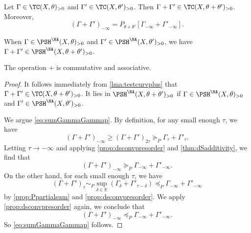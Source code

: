 \begin{proposition}\label{prop:testcurvesumproperty}
    Let $\Gamma \in \TC(X,\theta)_{>0}$ and $\Gamma' \in \TC(X,\theta')_{>0}$. Then $\Gamma+\Gamma'\in \TC(X,\theta+\theta')_{>0}$. Moreover,
    \begin{equation}\label{eq:sumGammaGammap}
    (\Gamma+\Gamma')_{-\infty}=P_{\theta+\theta'}\left[\Gamma_{-\infty}+\Gamma'_{-\infty}\right].
    \end{equation}

    When $\Gamma\in \PSH^{\NA}(X,\theta)_{>0}$ and $\Gamma'\in \PSH^{\NA}(X,\theta')_{>0}$, we have $\Gamma+\Gamma'\in \PSH^{\NA}(X,\theta+\theta')_{>0}$.

    The operation $+$ is commutative and associative.
\end{proposition}
\begin{proof}
    It follows immediately from \cref{lma:testcurvplus} that $\Gamma+\Gamma'\in \TC(X,\theta+\theta')_{>0}$. It lies in $\PSH^{\NA}(X,\theta+\theta')_{>0}$ if $\Gamma\in \PSH^{\NA}(X,\theta)_{>0}$ and $\Gamma'\in \PSH^{\NA}(X,\theta')_{>0}$.

    We argue \eqref{eq:sumGammaGammap}. By definition, for any small enough $\tau$, we have
    \[
    (\Gamma+\Gamma')_{-\infty}\geq (\Gamma+\Gamma')_{2\tau}\succeq_P \Gamma_{\tau}+\Gamma'_{\tau}.
    \]
    Letting $\tau\to -\infty$ and applying \cref{prop:dsconvpresorder} and \cref{thm:dSadditivity}, we find that
    \[
    (\Gamma+\Gamma')_{-\infty}\succeq_P \Gamma_{-\infty}+\Gamma'_{-\infty}.
    \]
    On the other hand, for each small enough $\tau$, we have
    \[
    (\Gamma+\Gamma')_{\tau}\sim_P \sup_{\delta\in \mathbb{R}}\left( \Gamma_\delta+\Gamma'_{\tau-\delta}\right) \preceq_P \Gamma_{-\infty}+\Gamma'_{-\infty}
    \]
    by \cref{prop:Ppartialsum} and \cref{prop:dsconvpresorder}. We apply \cref{prop:dsconvpresorder} again, we conclude that
    \[
     (\Gamma+\Gamma')_{-\infty} \preceq_P \Gamma_{-\infty}+\Gamma'_{-\infty}.
    \]
    So \eqref{eq:sumGammaGammap} follows.




\end{proof}

